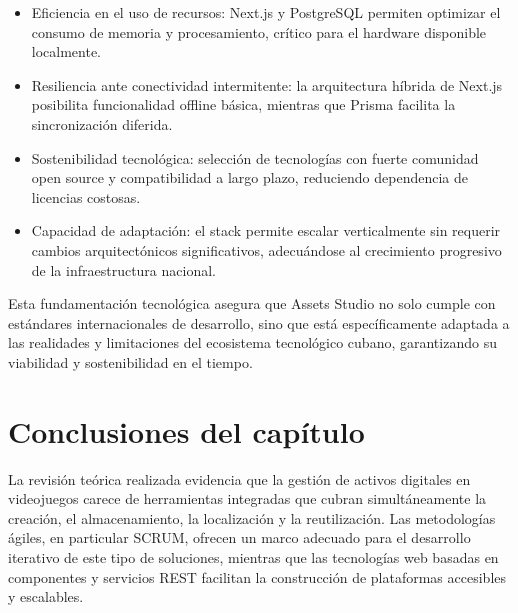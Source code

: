 \begin{itemize}
	\item Eficiencia en el uso de recursos: Next.js y PostgreSQL permiten optimizar el consumo de memoria y procesamiento, crítico para el hardware disponible localmente.
	\item Resiliencia ante conectividad intermitente: la arquitectura híbrida de Next.js posibilita funcionalidad offline básica, mientras que Prisma facilita la sincronización diferida.
	\item Sostenibilidad tecnológica: selección de tecnologías con fuerte comunidad open source y compatibilidad a largo plazo, reduciendo dependencia de licencias costosas.
	\item Capacidad de adaptación: el stack permite escalar verticalmente sin requerir cambios arquitectónicos significativos, adecuándose al crecimiento progresivo de la infraestructura nacional.
\end{itemize}

Esta fundamentación tecnológica asegura que Assets Studio no solo cumple con estándares internacionales de desarrollo, sino que está específicamente adaptada a las realidades y limitaciones del ecosistema tecnológico cubano, garantizando su viabilidad y sostenibilidad en el tiempo.

\section*{Conclusiones del capítulo}

La revisión teórica realizada evidencia que la gestión de activos digitales en videojuegos carece de herramientas integradas que cubran simultáneamente la creación, el almacenamiento, la localización y la reutilización. Las metodologías ágiles, en particular SCRUM, ofrecen un marco adecuado para el desarrollo iterativo de este tipo de soluciones, mientras que las tecnologías web basadas en componentes y servicios REST facilitan la construcción de plataformas accesibles y escalables.




